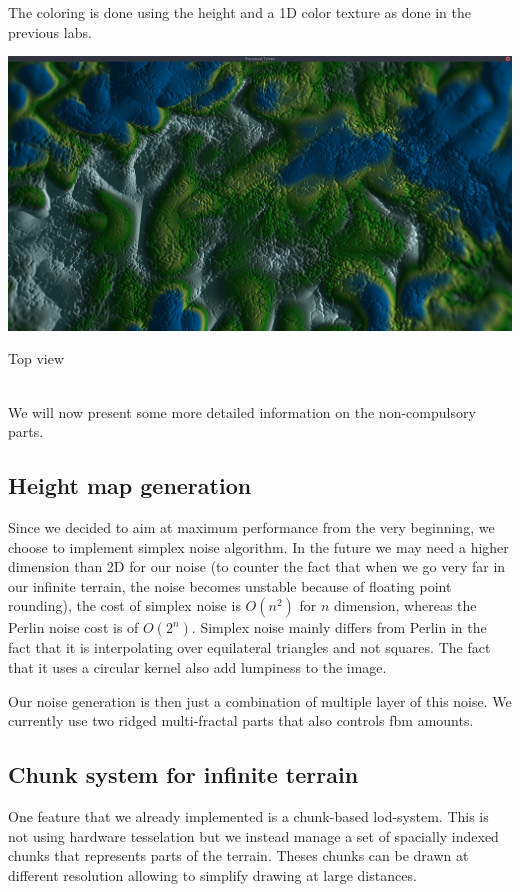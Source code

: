 \documentclass[11pt]{article}
\begin{document}
The coloring is done using the height and a 1D color texture as done in the
previous labs.\\

\begin{center}
\includegraphics[width=\textwidth]{screen02}
\caption{Top view}
\end{center} \\

We will now present some more detailed information on the non-compulsory parts.

\subsection{Height map generation}
Since we decided to aim at maximum performance from the very beginning, we
choose to implement simplex noise algorithm. In the future we may need a higher
dimension than 2D for our noise (to counter the fact that when we go very far in
our infinite terrain, the noise becomes unstable because of floating point
rounding), the cost of simplex noise is $O(n^2)$ for $n$ dimension, whereas the
Perlin noise cost is of $O(2^n)$. Simplex noise mainly differs from Perlin in the fact that it is interpolating over equilateral triangles and not squares. The fact that it uses a circular kernel also add lumpiness to the image.

Our noise generation is then just a combination of multiple layer of this noise.
We currently use two ridged multi-fractal parts that also controls fbm amounts.
\subsection{Chunk system for infinite terrain}
One feature that we already implemented is a chunk-based lod-system. This is not using hardware tesselation but we instead manage a set of spacially indexed chunks that represents parts of the terrain. Theses chunks can be drawn at different resolution allowing to simplify drawing at large distances.
\end{document}
